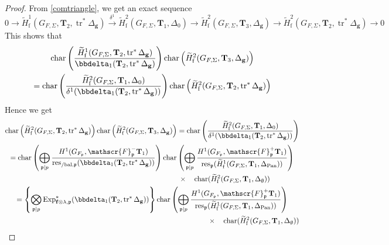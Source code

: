 \documentclass[10pt]{amsart}
\numberwithin{equation}{section}
\theoremstyle{definition}
\theoremstyle{remark} %
\DeclareMathOperator{\Char}{char}
\newcommand{\Exp}{\operatorname{Exp}}
\newcommand{\pan}{\mathrm{Pan}}
\DeclareMathOperator{\res}{res}
\DeclareMathOperator{\tr}{{tr}^*}
\renewcommand{\b}{\mathrm{bal}}
\newcommand{\f}{\mathbf{f}}
\newcommand{\scrF}{\mathscr{F}}
\newcommand{\g}{\mathbf{g}}
\newcommand{\p}{\mathfrak{p}}
\newcommand{\T}{\mathbf{T}}
\begin{document}
		\begin{proof}
			From \eqref{comtriangle}, we get an exact sequence
			\begin{equation}
				0 \rightarrow \widetilde{H}^1_{\mathrm{f}}(G_{F,\Sigma}, \T_2, \operatorname{tr}^*\Delta_{\g}) \xrightarrow{\delta^1} \widetilde{H}^2_{\mathrm{f}}(G_{F,\Sigma}, \T_1, \Delta_{0}) \rightarrow \widetilde{H}^2_{\mathrm{f}}(G_{F,\Sigma}, \T_3, \Delta_{\g}) \rightarrow \widetilde{H}^2_{\mathrm{f}}(G_{F,\Sigma}, \T_2, \operatorname{tr}^*\Delta_{\g}) \rightarrow 0
			\end{equation}
			This shows that 
			\begin{multline}
				\Char \left( \dfrac{\widetilde{H}^1_{\mathrm{f}}(G_{F,\Sigma}, \T_2, \operatorname{tr}^*\Delta_{\g})}{\bbdelta_1(\T_{2}, \tr\Delta_{\g})} \right) \Char \left( \widetilde{H}^2_{\mathrm{f}}(G_{F,\Sigma}, \T_3, \Delta_{\g})  \right) \\
				= \Char \left( \dfrac{\widetilde{H}^2_{\mathrm{f}}(G_{F,\Sigma}, \T_1, \Delta_{0})}{\delta^1(\bbdelta_1(\T_{2}, \tr\Delta_{\g}))} \right) \Char \left( \widetilde{H}^2_{\mathrm{f}}(G_{F,\Sigma}, \T_2, \operatorname{tr}^*\Delta_{\g}) \right)  
			\end{multline}
			Hence we get
			\begin{multline}
				\Char \left( \widetilde{H}^2_{\mathrm{f}}(G_{F,\Sigma}, \T_2, \operatorname{tr}^*\Delta_{\g}) \right)	\Char \left( \widetilde{H}^2_{\mathrm{f}}(G_{F,\Sigma}, \T_3, \Delta_{\g})  \right) =	\Char \left( \dfrac{\widetilde{H}^2_{\mathrm{f}}(G_{F,\Sigma}, \T_1, \Delta_{0})}{\delta^1(\bbdelta_1(\T_{2}, \tr\Delta_{\g}))} \right) \\	
				=  \Char\left( \bigoplus_{\p \mid p} \frac{H^1(G_{F_\p},\scrF^-_\p \T_{1})}{ \res_{/\b, \p}(\bbdelta_1(\T_2, \operatorname{tr}^*\Delta_{\g}))} \right) \Char\left( \bigoplus_{\p \mid p}\frac{H^1(G_{F_\p},\scrF^+_\p \T_{1})}{\res_{\p}(\widetilde{H}^1_{\mathrm{f}}(G_{F,\Sigma},\T_{1}, \Delta_{\pan})) }\right) \\
				\hfill \times \quad \Char(\widetilde{H}^2_{\mathrm{f}}(G_{F,\Sigma}, \T_1, \Delta_{\emptyset})) \qquad \qquad \\
				=\left\lbrace \bigotimes_{\p \mid p} \Exp^*_{\f\otimes \lambda, \p} (\bbdelta_1(\T_{2}, \tr \Delta_{\g}))\right\rbrace \Char\left( \bigoplus_{\p \mid p}\frac{H^1(G_{F_\p},\scrF^+_\p \T_{1})}{\res_{\p}(\widetilde{H}^1_{\mathrm{f}}(G_{F,\Sigma},\T_{1}, \Delta_{\pan})) }\right) \\
				\hfill \times \quad \Char(\widetilde{H}^2_{\mathrm{f}}(G_{F,\Sigma}, \T_1, \Delta_{\emptyset})) 

\end{multline}
\end{proof}
\end{document}
